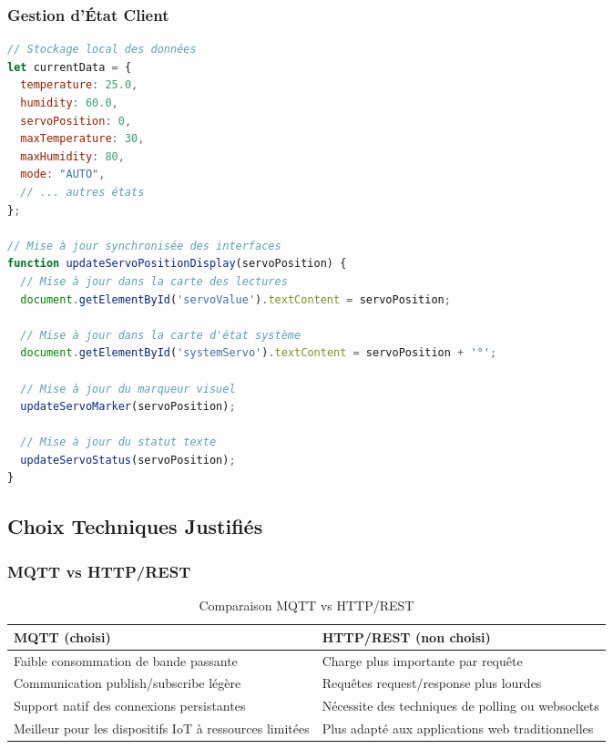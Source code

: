 \documentclass[12pt,a4paper]{article}
\begin{document}
\subsubsection{Gestion d'État Client}
\begin{lstlisting}[language=javascript, caption=Gestion d'état dans le client JavaScript]
// Stockage local des données
let currentData = {
  temperature: 25.0,
  humidity: 60.0,
  servoPosition: 0,
  maxTemperature: 30,
  maxHumidity: 80,
  mode: "AUTO",
  // ... autres états
};

// Mise à jour synchronisée des interfaces
function updateServoPositionDisplay(servoPosition) {
  // Mise à jour dans la carte des lectures
  document.getElementById('servoValue').textContent = servoPosition;
  
  // Mise à jour dans la carte d'état système
  document.getElementById('systemServo').textContent = servoPosition + '°';
  
  // Mise à jour du marqueur visuel
  updateServoMarker(servoPosition);
  
  // Mise à jour du statut texte
  updateServoStatus(servoPosition);
}
\end{lstlisting}

\subsection{Choix Techniques Justifiés}

\subsubsection{MQTT vs HTTP/REST}
\begin{table}[h]
    \centering
    \begin{tabular}{|p{6cm}|p{6cm}|}
        \hline
        \textbf{MQTT (choisi)} & \textbf{HTTP/REST (non choisi)} \\
        \hline
        Faible consommation de bande passante & Charge plus importante par requête \\
        \hline
        Communication publish/subscribe légère & Requêtes request/response plus lourdes \\
        \hline
        Support natif des connexions persistantes & Nécessite des techniques de polling ou websockets \\
        \hline
        Meilleur pour les dispositifs IoT à ressources limitées & Plus adapté aux applications web traditionnelles \\
        \hline
    \end{tabular}
    \caption{Comparaison MQTT vs HTTP/REST}
    \label{tab:mqtt_vs_http}
\end{table}
\end{document}
